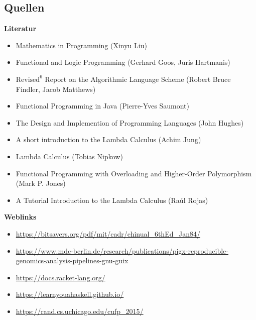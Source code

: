 \documentclass{beamer}
\begin{document}
\begin{frame}
	\section{Quellen}
	\fontsize{8pt}{10pt}
	\centering
	\textbf{Literatur}
	\begin{itemize}
    \item Mathematics in Programming (Xinyu Liu)
\item Functional and Logic Programming (Gerhard Goos, Juris Hartmanis)
\item $\text{Revised}^6$ Report on the Algorithmic Language
Scheme (Robert Bruce Findler, Jacob Matthews)
\item Functional Programming in Java (Pierre-Yves Saumont)
\item The Design and Implemention of Programming Languages (John Hughes)
\item A short introduction to the Lambda Calculus (Achim Jung)
\item Lambda Calculus (Tobias Nipkow) 
\item   Functional Programming with Overloading and
Higher-Order Polymorphism (Mark P. Jones)
\item A Tutorial Introduction to the Lambda Calculus (Raúl Rojas)
 \end{itemize}
 \textbf{Weblinks}
	\begin{itemize}
        \item \url{https://bitsavers.org/pdf/mit/cadr/chinual_6thEd_Jan84/}
        \item \url{https://www.mdc-berlin.de/research/publications/pigx-reproducible-genomics-analysis-pipelines-gnu-guix}
        \item \url{https://docs.racket-lang.org/}
        \item \url{https://learnyouahaskell.github.io/}
        \item \url{https://rand.cs.uchicago.edu/cufp_2015/}
	\end{itemize}
 
\end{frame}
\end{document}
